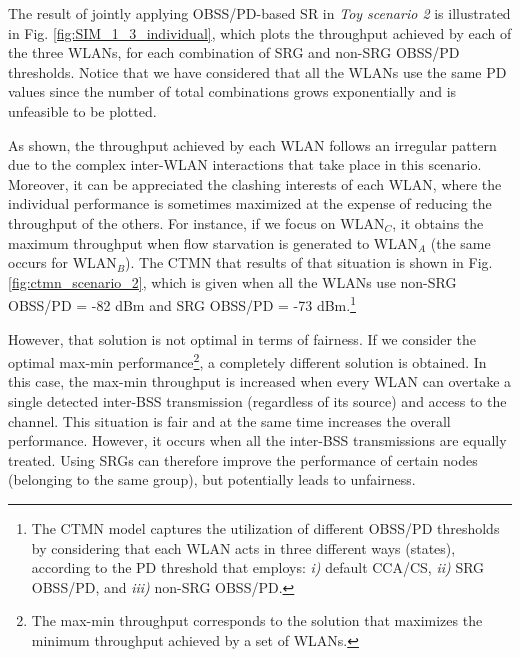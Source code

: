 \documentclass[preprint,12pt]{elsarticle}
\begin{document}
	The result of jointly applying OBSS/PD-based SR in \emph{Toy scenario 2} is illustrated in Fig. \ref{fig:SIM_1_3_individual}, which plots the throughput achieved by each of the three WLANs, for each combination of SRG and non-SRG OBSS/PD thresholds. Notice that we have considered that all the WLANs use the same PD values since the number of total combinations grows exponentially and is unfeasible to be plotted.
		
	As shown, the throughput achieved by each WLAN follows an irregular pattern due to the complex inter-WLAN interactions that take place in this scenario. Moreover, it can be appreciated the clashing interests of each WLAN, where the individual performance is sometimes maximized at the expense of reducing the throughput of the others. For instance, if we focus on $\text{WLAN}_C$, it obtains the maximum throughput when flow starvation is generated to $\text{WLAN}_A$ (the same occurs for $\text{WLAN}_B$). The CTMN that results of that situation is shown in Fig. \ref{fig:ctmn_scenario_2}, which is given when all the WLANs use non-SRG OBSS/PD = -82 dBm and SRG OBSS/PD = -73 dBm.\footnote{The CTMN model captures the utilization of different OBSS/PD thresholds by considering that each WLAN acts in three different ways (states), according to the PD threshold that employs: \emph{i)} default CCA/CS, \emph{ii)} SRG OBSS/PD, and \emph{iii)} non-SRG OBSS/PD.}
	
	However, that solution is not optimal in terms of fairness. If we consider the optimal max-min performance\footnote{The max-min throughput corresponds to the solution that maximizes the minimum throughput achieved by a set of WLANs.}, a completely different solution is obtained. In this case, the max-min throughput is increased when every WLAN can overtake a single detected inter-BSS transmission (regardless of its source) and access to the channel. This situation is fair and at the same time increases the overall performance. However, it occurs when all the inter-BSS transmissions are equally treated. Using SRGs can therefore improve the performance of certain nodes (belonging to the same group), but potentially leads to unfairness. 
	
\end{document}

